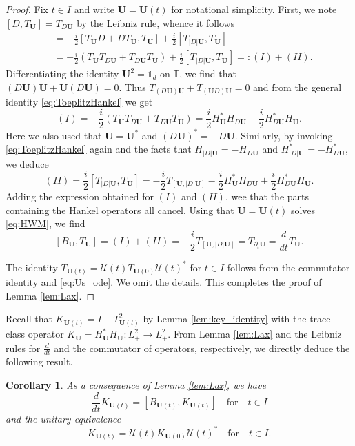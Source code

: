 \documentclass[10pt,reqno,a4paper]{amsart}
\newtheorem{cor}{Corollary}[section]
\theoremstyle{definition}
\theoremstyle{remark}
\theoremstyle{remark}
\numberwithin{equation}{section}
\newcommand{\T}{\mathbb{T}}
\newcommand{\pt}{\partial}
\newcommand{\Ub}{\mathbf{U}}
\newcommand{\id}{I}
\newcommand{\Us}{\mathscr{U}}
\begin{document}
\begin{proof}
Fix $t \in I$ and write $\Ub=\Ub(t)$ for notational simplicity. First, we  note $[D,T_\Ub] = T_{D \Ub}$ by the Leibniz rule, whence it follows
\begin{align*}
[B_{\Ub}, T_{\Ub}] & = -\frac{i}{2} [ T_\Ub  D + D  T_\Ub, T_\Ub] + \frac{i}{2} [T_{|D| \Ub}, T_\Ub] \\
& = -\frac{i}{2} \left (T_\Ub T_{D \Ub} + T_{D \Ub} T_\Ub \right ) + \frac{i}{2} [T_{|D| \Ub}, T_\Ub] =: (I) + (II).
\end{align*}
Differentiating the identity $\Ub^2 = \mathds{1}_d$ on $\T$, we find that $(D \Ub) \Ub + \Ub (D \Ub) = 0$. Thus $T_{(D \Ub) \Ub} + T_{(\Ub D) \Ub} = 0$ and from the general identity \eqref{eq:ToeplitzHankel} we get
$$
(I)  = -\frac{i}{2} \left ( T_{\Ub} T_{D \Ub} + T_{D \Ub} T_{\Ub} \right ) = \frac{i}{2}  H^*_\Ub H_{D \Ub} - \frac{i}{2} H^*_{D \Ub} H_\Ub  .
$$
Here we also used that $\Ub= \Ub^*$ and $(D \Ub)^* = -D \Ub$. Similarly, by invoking \eqref{eq:ToeplitzHankel} again and the facts that $H_{|D| \Ub} = -H_{D \Ub}$ and $H^*_{|D| \Ub} = -H^*_{D \Ub}$, we deduce
$$
(II)  = \frac{i}{2} [T_{|D|\Ub}, T_{\Ub}]  = -\frac{i}{2} T_{[\Ub, |D| \Ub]} - \frac{i}{2} H^*_\Ub H_{D \Ub} + \frac{i}{2} H^*_{D \Ub} H_{\Ub}.
$$
Adding the expression obtained for $(I)$ and $(II)$, wee that the parts containing the Hankel operators all cancel. Using that $\Ub= \Ub(t)$ solves \eqref{eq:HWM}, we find
$$
[B_\Ub, T_\Ub] = (I) + (II) = -\frac{i}{2} T_{[\Ub, |D| \Ub]} =  T_{\pt_t \Ub} = \frac{d}{dt} T_{\Ub}.
$$

The identity $T_{\Ub(t)} = \Us(t) T_{\Ub(0)} \Us(t)^*$ for $t \in I$ follows from the commutator identity and \eqref{eq:Us_ode}. We omit the details. This completes the proof of Lemma \ref{lem:Lax}.
\end{proof}

Recall that $K_{\Ub(t)} = \id - T_{\Ub(t)}^2$ by Lemma \ref{lem:key_identity} with the trace-class operator $K_{\Ub} = H^*_\Ub H_\Ub : L^2_+ \to L^2_+$. From Lemma \ref{lem:Lax} and the Leibniz rules for $\frac{d}{dt}$ and the commutator of operators, respectively, we directly deduce the following result.

\begin{cor} \label{cor:Lax2}
As a consequence of Lemma \ref{lem:Lax}, we have
$$
\frac{d}{dt} K_{\Ub(t)} = \left  [B_{\Ub(t)}, K_{\Ub(t)} \right ] \quad \mbox{for} \quad t \in I
$$
and the unitary equivalence
$$
K_{\Ub(t)} = \Us(t) K_{\Ub(0)} \Us(t)^* \quad \mbox{for} \quad t \in I.
$$
\end{cor}
\end{document}
